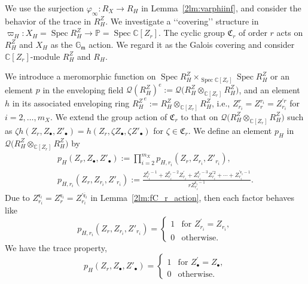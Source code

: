 \documentclass[pdftex]{sigma}
\def\CC{{\mathbb C}}
\def\GG{{\mathbb G}}
\def\PP{{\mathbb P}}
\def\cQ{{\mathcal Q}}
\def\fC{{\mathfrak C}}
\def\fm{{\mathfrak m}}
\def\fr{{\mathfrak r}}
\def\Bfr{{\overline{\mathfrak r}}}
\def\Spec{\operatorname{Spec}}
\numberwithin{equation}{section}
\begin{document}
We use the surjection $\varphi_\infty\colon R_X \to R_H$ in Lemma~\ref{2lm:varphiinf}, and consider the behavior of the trace in $R_H^Z$.
We investigate a {\lq\lq}covering{\rq\rq} structure in $\varpi_H\colon X_H=\Spec R_H^Z \to \PP=\Spec \CC[Z_r]$.
The cyclic group $\fC_r$ of order $r$ acts on $R_H^Z$ and $X_H$ as the $\GG_\fm$ action.
We regard it as the Galois covering and consider $\CC[Z_r]$-module $R_H^Z$ and $R_H$.

We introduce a meromorphic function on $\Spec R_H^Z \times_{\Spec \CC[Z_r]} \Spec R_H^Z$ or an element $p$ in the enveloping field $\cQ(R_H^Z)^e:=\cQ\big(R_H^Z \otimes_{\CC[Z_r]} R_H^Z\big)$, and an element $h$ in its associated enveloping ring ${R_H^{Z}}^e:=R_H^Z \otimes_{\CC[Z_r]} R_H^Z$, i.e., $Z_{r_i}^{r}=Z_r^{r_i}=Z_{r_i}^{\prime r}$ for $i=2, \dots, m_X$.
We extend the group action of $\fC_r$ to that on $\cQ\big(R_H^Z \otimes_{\CC[Z_r]} R_H^Z\big)$ such as $\zeta h(Z_r, Z_\bullet, Z'_\bullet) = h(Z_r, \zeta Z_\bullet, \zeta Z'_\bullet)$ for $\zeta \in \fC_r$.
We define an element $p_{H}$ in $\cQ\big(R_H^Z \otimes_{\CC[Z_r]} R_H^Z\big)$ by
\begin{gather}
p_{H}(Z_r, Z_\bullet, Z'_\bullet) :=\prod_{i=2}^{m_X}p_{H, r_i}(Z_r, Z_{r_i}, Z'_{r_i}),\nonumber\\
p_{H, r_i}(Z_r, Z_{r_i}, Z'_{r_i}) :=\frac{Z^{\fr_i-1}_{r_i}+Z^{\fr_i-2}_{r_i}Z^{\prime}_{r_i}
+Z^{\fr_i-3}_{r_i}Z^{\prime 2}_{r_i}+\cdots+Z^{\prime \fr_i-1}_{r_i}}{r Z_{r_i}^{\fr_i-1}}.\label{2eq:p_varphiH}
\end{gather}
Due to $Z_{r_i}^{\fr_i} = Z_r^{\fr_i}=Z_{r_i}^{\prime \Bfr_i}$ in Lemma~\ref{2lm:fC_r_action}, then each factor behaves like
\[
p_{H, r_i}(Z_r, Z_{r_i}, Z'_{r_i})
= \begin{cases}
1 & \text{for } Z^{\prime}_{r_i}=Z_{r_i},\\
0 & \text{otherwise}.\end{cases}
\]
We have the trace property,
\begin{equation}
p_{H}(Z_r, Z_\bullet, Z'_\bullet)
= \begin{cases}
1 & \text{for } Z^{\prime}_{\bullet}=Z_{\bullet},\\
0 & \text{otherwise}.\end{cases}
\label{2eq:6aa}
\end{equation}
\end{document}
